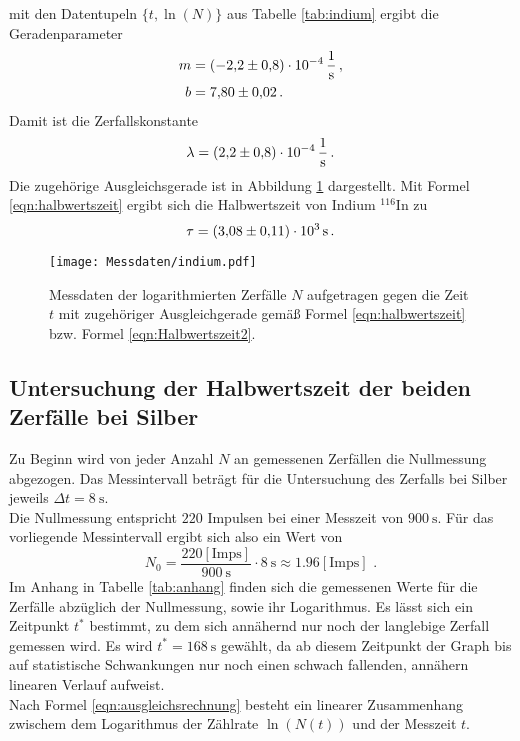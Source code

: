 mit den Datentupeln $\{ t, \ln (N)\}$ aus Tabelle \ref{tab:indium} ergibt die Geradenparameter
\begin{align*}
	m &= \SI{-2,2(8)E-04}{\per\second}  \, \mathrm{,} \\
	b &= \num{7,80(2)} \, \mathrm{.}
\end{align*}
Damit ist die Zerfallskonstante
\begin{equation*}
	\lambda = \SI{2,2(8)E-04}{\per\second}  \, \mathrm{.} \\
\end{equation*}
Die zugehörige Ausgleichsgerade ist in Abbildung \ref{fig:indium} dargestellt.
Mit Formel \eqref{eqn:halbwertszeit} ergibt sich die Halbwertszeit von Indium $^{116}\mathrm{In}$
zu
\begin{equation*}
	\tau =  \SI{3.08(11)E03}{\second} \, \mathrm{.}
\end{equation*}
\begin{figure}
	\centering
	\texttt{[image: Messdaten/indium.pdf]}
	\caption{Messdaten der logarithmierten Zerfälle $N$ aufgetragen gegen die Zeit $t$ mit zugehöriger Ausgleichgerade gemäß Formel \eqref{eqn:halbwertszeit} bzw. Formel \eqref{eqn:Halbwertszeit2}.}
	\label{fig:indium}
\end{figure}






\subsection{Untersuchung der Halbwertszeit der beiden Zerfälle bei Silber}
Zu Beginn wird von jeder Anzahl $N$ an gemessenen Zerfällen die Nullmessung abgezogen.
Das Messintervall beträgt für die Untersuchung des Zerfalls bei Silber jeweils $\Delta t = \SI{8}{\second}$.\\
Die Nullmessung entspricht $220$ Impulsen bei einer Messzeit von $\SI{900}{\second}$.
Für das vorliegende Messintervall ergibt sich also ein Wert von
\begin{equation*}
	N_0=\frac{220\mathrm{ [Imps]}}{\SI{900}{\second}}\cdot \SI{8}{\second}\approx 1.96\mathrm{ [Imps]}\text{ .}
\end{equation*}
Im Anhang in Tabelle \ref{tab:anhang} finden sich die gemessenen Werte für die Zerfälle abzüglich der Nullmessung, sowie ihr Logarithmus.
Es lässt sich ein Zeitpunkt $t^{*}$ bestimmt, zu dem sich annähernd nur noch der langlebige Zerfall gemessen wird.
Es wird $t^{*}=\SI{168}{\second}$ gewählt, da ab diesem Zeitpunkt der Graph bis auf statistische Schwankungen nur noch einen schwach fallenden, annähern linearen Verlauf aufweist.\\
Nach Formel \eqref{eqn:ausgleichsrechnung} besteht ein linearer Zusammenhang zwischem dem Logarithmus der Zählrate $\ln{(N(t))}$ und der Messzeit $t$.

